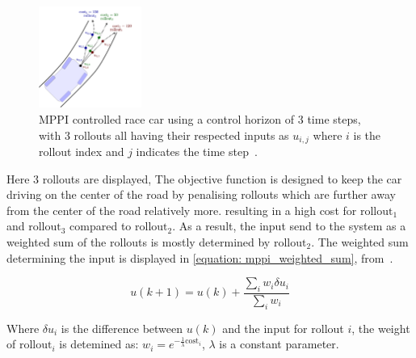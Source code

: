 \begin{figure}[H]
    \centering
    \includegraphics[width=0.3\textwidth]{figures/appendix/MPPI_car_with_rollouts.png}
    \caption{\acs{MPPI} controlled race car using a control horizon of 3 time steps, with 3 rollouts all having their respected inputs as $u_{i,j}$ where $i$ is the rollout index and $j$ indicates the time step~\cite{neuromorphictutorial_ltc21_2021}.}
    \label{figure: mppi_car_with_rollouts}
\end{figure}

Here 3 rollouts are displayed, The objective function is designed to keep the car driving on the center of the road by penalising rollouts which are further away from the center of the road relatively more. resulting in a high cost for $\text{rollout}_1$ and $\text{rollout}_3$ compared to $\text{rollout}_2$. As a result, the input send to the system as a weighted sum of the rollouts is mostly determined by $\text{rollout}_2$. The weighted sum determining the input is displayed in \cref{equation: mppi_weighted_sum}, from~\cite{neuromorphictutorial_ltc21_2021}.

\begin{equation}
u(k+1)=u(k)+\frac{\sum_{i} w_{i} \delta u_{i}}{\sum_{i} w_{i}}
\label{equation: mppi_weighted_sum}
\end{equation}

Where $\delta u_i$ is the difference between $u(k)$ and the input for rollout $i$, the weight of $\text{rollout}_i$ is detemined as: $w_{i}=e^{-\frac{1}{\lambda} \text{cost}_{i}}$, $\lambda$ is a constant parameter.\bs

%
%
%

